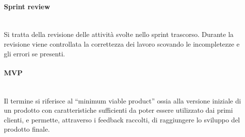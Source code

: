 \paragraph{Sprint review}~\smallskip \\
Si tratta della revisione delle attività svolte nello sprint trascorso. Durante la revisione viene controllata la correttezza
dei lavoro scovando le incompletezze e gli errori se presenti.

\paragraph{MVP}~\smallskip \\
Il termine si riferisce al “minimum viable product” ossia alla versione iniziale di un prodotto con 
caratteristiche sufficienti da poter essere utilizzato dai primi clienti, e permette, attraverso i feedback raccolti, di raggiungere lo sviluppo del prodotto finale.
